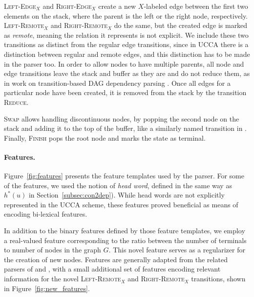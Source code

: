 \documentclass[11pt]{article}
\newcommand{\secref}[1]{Section~\ref{#1}}
\newcommand{\figref}[1]{Figure~\ref{#1}}
\begin{document}
\textsc{Left-Edge$_X$} and \textsc{Right-Edge$_X$} create a new $X$-labeled edge between the first two elements on the stack, where the parent is the left or the right node, respectively. \textsc{Left-Remote$_X$} and \textsc{Right-Remote$_X$} do the same, but the created edge is marked as \textit{remote}, meaning the relation it represents is not explicit. We include these two transitions as distinct from the regular edge transitions, since in UCCA there is a distinction between regular and remote edges, and this distinction has to be made in the parser too.
In order to allow nodes to have multiple parents, all node and edge transitions leave the
stack and buffer as they are and do not reduce them,
as in work on transition-based DAG dependency parsing \cite{sagae2008shift,tokgoz2015transition}.
Once all edges for a particular node have been created, it is removed from the stack
by the transition \textsc{Reduce}.

\textsc{Swap} allows handling discontinuous nodes, by popping the second
node on the stack and adding it to the top of the buffer, like a
similarly named transition in \cite{maier2015discontinuous}.
Finally, \textsc{Finish} pops the root node and marks the state as terminal.

\paragraph{Features.}
\label{subsec:features}

\figref{fig:features} presents the feature templates used by the parser.
For some of the features, we used the notion of \textit{head word}, defined in the same way as $h^*(u)$ in \secref{subsec:con2dep}).
While head words are not explicitly represented in the UCCA scheme, these
features proved beneficial as means of encoding bi-lexical features.

In addition to the binary features defined by those feature templates,
we employ a real-valued feature corresponding to the ratio between the number of terminals to number of nodes
in the graph $G$. This novel feature serves as a regularizer for the creation of new nodes.
Features are generally adapted from the related parsers of  and
, with a small additional set of features encoding relevant information
for the novel \textsc{Left-Remote$_X$} and \textsc{Right-Remote$_X$} transitions, shown in \figref{fig:new_features}.
\end{document}
